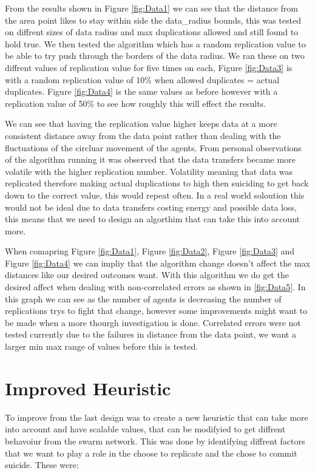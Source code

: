 \documentclass{UoYCSproject}
\begin{document}
From the results shown in Figure \ref{fig:Data1} we can see that the distance from the area point likes to stay within side the data\_radius bounds, this was tested on diffrent sizes of data radius and max duplications allowed and still found to hold true.
We then tested the algorithm which has a random replication value to be able to try push through the borders of the data radius.
We ran these on two diffrent values of replication value for five times on each, Figure \ref{fig:Data3} is with a random replication value of 10\% when allowed duplicates = actual duplicates.
Figure \ref{fig:Data4} is the same values as before however with a replication value of 50\% to see how roughly this will effect the results.

We can see that having the replication value higher keeps data at a more consistent distance away from the data point rather than dealing with the fluctuations of the circluar movement of the agents.
From personal observations of the algorithm running it was observed that the data transfers became more volatile with the higher replication number.
Volatility meaning that data was replicated therefore making actual duplications to high then suiciding to get back down to the correct value, this would repeat often.
In a real world soloution this would not be ideal due to data transfers costing energy and possible data loss, this means that we need to design an algorthim that can take this into account more.

When comapring Figure \ref{fig:Data1}, Figure \ref{fig:Data2}, Figure \ref{fig:Data3} and Figure \ref{fig:Data4} we can impliy that the algorithm change doesn't affect the max distances like our desired outcomes want.
With this algorithm we do get the desired affect when dealing with non-correlated errors as shown in \ref{fig:Data5}.
In this graph we can see as the number of agents is decreasing the number of replications trys to fight that change, however some improvements might want to be made when a more thourgh investigation is done.
Correlated errors were not tested currently due to the failures in distance from the data point, we want a larger min max range of values before this is tested.



\section{Improved Heuristic}
\label{sec:Simple2}

To improve from the last design was to create a new heuristic that can take more into account and have scalable values, that can be modifyied to get diffrent behavoiur from the swarm network.
This was done by identifying diffrent factors that we want to play a role in the choose to replicate and the chose to commit suicide.
These were:
\end{document}
